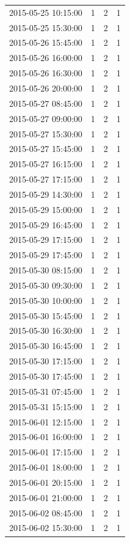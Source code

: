 \begin{tabular}{lrrr}
2015-05-25 10:15:00 & 1 & 2 & 1 \\
2015-05-25 15:30:00 & 1 & 2 & 1 \\
2015-05-26 15:45:00 & 1 & 2 & 1 \\
2015-05-26 16:00:00 & 1 & 2 & 1 \\
2015-05-26 16:30:00 & 1 & 2 & 1 \\
2015-05-26 20:00:00 & 1 & 2 & 1 \\
2015-05-27 08:45:00 & 1 & 2 & 1 \\
2015-05-27 09:00:00 & 1 & 2 & 1 \\
2015-05-27 15:30:00 & 1 & 2 & 1 \\
2015-05-27 15:45:00 & 1 & 2 & 1 \\
2015-05-27 16:15:00 & 1 & 2 & 1 \\
2015-05-27 17:15:00 & 1 & 2 & 1 \\
2015-05-29 14:30:00 & 1 & 2 & 1 \\
2015-05-29 15:00:00 & 1 & 2 & 1 \\
2015-05-29 16:45:00 & 1 & 2 & 1 \\
2015-05-29 17:15:00 & 1 & 2 & 1 \\
2015-05-29 17:45:00 & 1 & 2 & 1 \\
2015-05-30 08:15:00 & 1 & 2 & 1 \\
2015-05-30 09:30:00 & 1 & 2 & 1 \\
2015-05-30 10:00:00 & 1 & 2 & 1 \\
2015-05-30 15:45:00 & 1 & 2 & 1 \\
2015-05-30 16:30:00 & 1 & 2 & 1 \\
2015-05-30 16:45:00 & 1 & 2 & 1 \\
2015-05-30 17:15:00 & 1 & 2 & 1 \\
2015-05-30 17:45:00 & 1 & 2 & 1 \\
2015-05-31 07:45:00 & 1 & 2 & 1 \\
2015-05-31 15:15:00 & 1 & 2 & 1 \\
2015-06-01 12:15:00 & 1 & 2 & 1 \\
2015-06-01 16:00:00 & 1 & 2 & 1 \\
2015-06-01 17:15:00 & 1 & 2 & 1 \\
2015-06-01 18:00:00 & 1 & 2 & 1 \\
2015-06-01 20:15:00 & 1 & 2 & 1 \\
2015-06-01 21:00:00 & 1 & 2 & 1 \\
2015-06-02 08:45:00 & 1 & 2 & 1 \\
2015-06-02 15:30:00 & 1 & 2 & 1 \\

\end{tabular}
